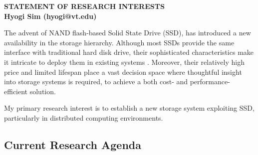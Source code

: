 \documentclass[letterpaper, 10pt]{article}
\begin{document}
\thispagestyle{fancy}
\lhead{}
\rhead{}
\renewcommand{\headrulewidth}{0pt} 
\renewcommand{\footrulewidth}{0pt} 


\pagestyle{fancy}


\begin{center}
{\Large \bf STATEMENT OF RESEARCH INTERESTS}\\
\vspace*{0.1cm}
{\bf Hyogi Sim (hyogi@vt.edu)}
\end{center}

\vspace{0.5cm}


The advent of NAND flash-based Solid State Drive (SSD), has introduced a new
availability in the storage hierarchy. Although most SSDs provide the same
interface with traditional hard disk drive, their sophisticated characteristics
make it intricate to deploy them in existing systems
\cite{flashchar}\cite{ssdtradeoffs}.
Moreover, their relatively high price and limited lifespan place a vast
decision space where thoughtful insight into storage systems is required,
to achieve a both cost- and performance- efficient solution.

My primary research interest is to establish a new storage system exploiting
SSD, particularly in distributed computing environments.


\subsection*{Current Research Agenda}
\end{document}
